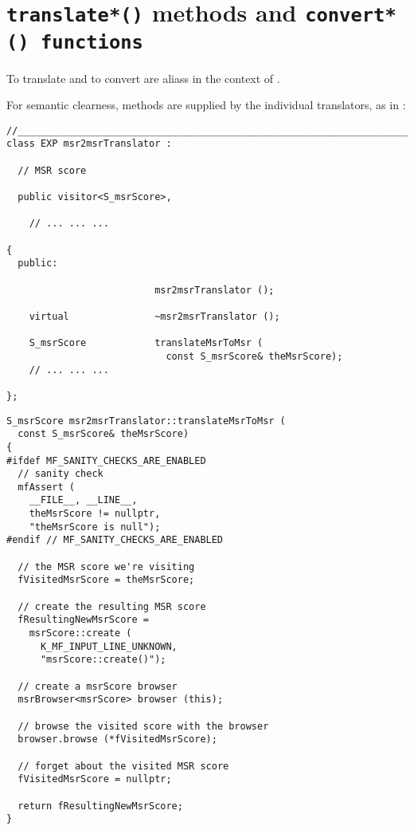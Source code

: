 \section{{\tt translate*()} methods and {\tt convert*() functions}}

To translate and to convert are aliass in the context of \mf.

For semantic clearness,  methods are supplied by the individual translators, as in :
\begin{lstlisting}[language=CPlusPlus]
//________________________________________________________________________
class EXP msr2msrTranslator :

  // MSR score

  public visitor<S_msrScore>,

	// ... ... ...

{
  public:

                          msr2msrTranslator ();

    virtual               ~msr2msrTranslator ();

    S_msrScore            translateMsrToMsr (
                            const S_msrScore& theMsrScore);
	// ... ... ...

};
\end{lstlisting}

\begin{lstlisting}[language=CPlusPlus]
S_msrScore msr2msrTranslator::translateMsrToMsr (
  const S_msrScore& theMsrScore)
{
#ifdef MF_SANITY_CHECKS_ARE_ENABLED
  // sanity check
  mfAssert (
    __FILE__, __LINE__,
    theMsrScore != nullptr,
    "theMsrScore is null");
#endif // MF_SANITY_CHECKS_ARE_ENABLED

  // the MSR score we're visiting
  fVisitedMsrScore = theMsrScore;

  // create the resulting MSR score
  fResultingNewMsrScore =
    msrScore::create (
      K_MF_INPUT_LINE_UNKNOWN,
      "msrScore::create()");

  // create a msrScore browser
  msrBrowser<msrScore> browser (this);

  // browse the visited score with the browser
  browser.browse (*fVisitedMsrScore);

  // forget about the visited MSR score
  fVisitedMsrScore = nullptr;

  return fResultingNewMsrScore;
}
\end{lstlisting}


